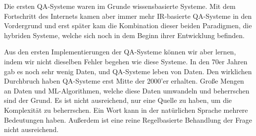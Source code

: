 \documentclass[../Masterarbeit.tex]{subfiles}
\begin{document}
Die ersten QA-Systeme waren im Grunde wissensbasierte Systeme. Mit dem Fortschritt des Internets kamen aber immer mehr IR-basierte QA-Systeme in den Vordergrund und erst später kam die Kombination dieser beiden Paradigmen, die hybriden Systeme, welche sich noch in dem Beginn ihrer Entwicklung befinden. 

Aus den ersten Implementierungen der QA-Systeme können wir aber lernen, indem wir nicht dieselben Fehler begehen wie diese Systeme. In den 70er Jahren gab es noch sehr wenig Daten, und QA-Systeme leben von Daten. Den wirklichen Durchbruch haben QA-Systeme erst Mitte der 2000'er erhalten. Große Mengen an Daten und ML-Algorithmen, welche diese Daten umwandeln und beherrschen sind der Grund. Es ist nicht ausreichend, nur eine Quelle zu haben, um die Komplexität zu beherrschen. Ein Wort kann in der natürlichen Sprache mehrere Bedeutungen haben. Außerdem ist eine reine Regelbasierte Behandlung der Frage nicht ausreichend.
\end{document}

